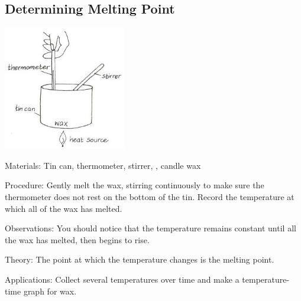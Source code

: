 \begin{multicols}{2}
\subsection{Determining Melting Point}

\begin{center}
\includegraphics[width=0.4\textwidth]{./img/vso/melting-point.jpg}
\end{center}

\begin{description*}
\item[Materials:]{Tin can, thermometer, stirrer, , candle wax}
\item[Procedure:]{Gently melt the wax, stirring continuously to make sure the thermometer does not rest on the bottom of the tin. Record the temperature at which all of the wax has melted.}
\item[Observations:]{You should notice that the temperature remains constant until all the wax has melted, then begins to rise.}
\item[Theory:]{The point at which the temperature changes is the melting point.}
\item[Applications:]{Collect several temperatures over time and make a temperature-time graph for wax.}
\end{description*}


\end{multicols}
